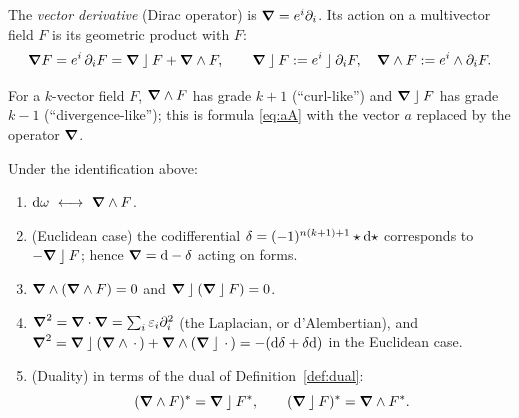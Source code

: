 \begin{definition}
The \emph{vector derivative} (Dirac operator) is $\boldsymbol{\nabla}=e^i\partial_i$. Its action on a multivector field $F$ is its geometric product with $F$:
\[
 \boldsymbol{\nabla} F=e^i\,\partial_iF=\boldsymbol{\nabla}\mathbin{\rfloor} F+\boldsymbol{\nabla}\wedge F,\qquad \boldsymbol{\nabla}\mathbin{\rfloor} F:=e^i\mathbin{\rfloor}\partial_iF,\quad \boldsymbol{\nabla}\wedge F:=e^i\wedge\partial_iF .
\]
\end{definition}

For a $k$-vector field $F$, $\boldsymbol{\nabla}\wedge F$ has grade $k+1$ (``curl-like'') and $\boldsymbol{\nabla}\mathbin{\rfloor} F$ has grade $k-1$ (``divergence-like''); this is formula \eqref{eq:aA} with the vector $a$ replaced by the operator $\boldsymbol{\nabla}$.

\begin{theorem}[$\dd$ is $\vd\wedge$]\label{thm:dGA}
Under the identification above:
\begin{enumerate}
  \item $\dd\omega\ \longleftrightarrow\ \vd\wedge F$.
  \item (Euclidean case) the codifferential $\delta=(-1)^{n(k+1)+1}\star\mathrm{d}\star$ corresponds to $-\boldsymbol{\nabla}\mathbin{\rfloor} F$; hence $\boldsymbol{\nabla}=\mathrm{d}-\delta$ acting on forms.
  \item $\boldsymbol{\nabla}\wedge(\boldsymbol{\nabla}\wedge F)=0$ and $\boldsymbol{\nabla}\mathbin{\rfloor}(\boldsymbol{\nabla}\mathbin{\rfloor} F)=0$.
  \item $\boldsymbol{\nabla}^2=\boldsymbol{\nabla}\cdot\boldsymbol{\nabla}=\sum_i\varepsilon_i\partial_i^2$ (the Laplacian, or d'Alembertian), and $\boldsymbol{\nabla}^2=\boldsymbol{\nabla}\mathbin{\rfloor}(\boldsymbol{\nabla}\wedge\,\cdot\,)+\boldsymbol{\nabla}\wedge(\boldsymbol{\nabla}\mathbin{\rfloor}\,\cdot\,)=-(\mathrm{d}\delta+\delta\mathrm{d})$ in the Euclidean case.
  \item (Duality) in terms of the dual of Definition~\ref{def:dual}:
  \[
   (\boldsymbol{\nabla}\wedge F)^{\ast}=\boldsymbol{\nabla}\mathbin{\rfloor}F^{\ast},\qquad (\boldsymbol{\nabla}\mathbin{\rfloor} F)^{\ast}=\boldsymbol{\nabla}\wedge F^{\ast} .
  \]
\end{enumerate}
\end{theorem}
